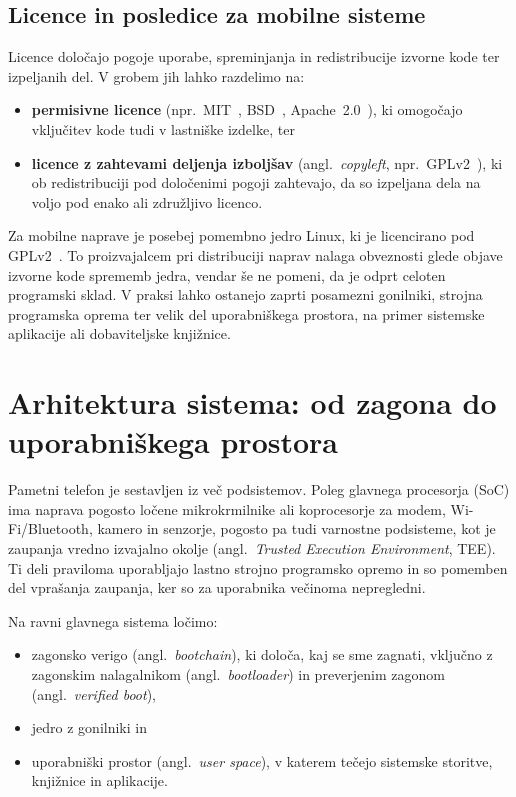 \documentclass[a4paper,12pt,openright]{book}
\begin{document}
\subsection{Licence in posledice za mobilne sisteme}
\label{subsec:teorija_licence}

Licence določajo pogoje uporabe, spreminjanja in redistribucije izvorne kode ter izpeljanih del.
V grobem jih lahko razdelimo na:
\begin{itemize}
  \item \textbf{permisivne licence} (npr.~MIT~\cite{license_mit}, BSD~\cite{license_bsd3}, Apache~2.0~\cite{license_apache2}), ki omogočajo vključitev kode tudi v lastniške izdelke, ter
  \item \textbf{licence z zahtevami deljenja izboljšav} (angl.~\textit{copyleft}, npr.~GPLv2~\cite{license_gpl2}), ki ob redistribuciji pod določenimi pogoji zahtevajo, da so izpeljana dela na voljo pod enako ali združljivo licenco.
\end{itemize}

Za mobilne naprave je posebej pomembno jedro Linux, ki je licencirano pod GPLv2~\cite{license_gpl2}.
To proizvajalcem pri distribuciji naprav nalaga obveznosti glede objave izvorne kode sprememb jedra, vendar še ne pomeni, da je odprt celoten programski sklad.
V praksi lahko ostanejo zaprti posamezni gonilniki, strojna programska oprema ter velik del uporabniškega prostora, na primer sistemske aplikacije ali dobaviteljske knjižnice.

\section{Arhitektura sistema: od zagona do uporabniškega prostora}
\label{sec:teorija_arhitektura}

Pametni telefon je sestavljen iz več podsistemov.
Poleg glavnega procesorja (SoC) ima naprava pogosto ločene mikrokrmilnike ali koprocesorje za modem, Wi-Fi/Bluetooth, kamero in senzorje, pogosto pa tudi varnostne podsisteme, kot je zaupanja vredno izvajalno okolje (angl.~\textit{Trusted Execution Environment}, TEE).
Ti deli praviloma uporabljajo lastno strojno programsko opremo in so pomemben del vprašanja zaupanja, ker so za uporabnika večinoma nepregledni.

Na ravni glavnega sistema ločimo:
\begin{itemize}
  \item zagonsko verigo (angl.~\textit{bootchain}), ki določa, kaj se sme zagnati, vključno z zagonskim nalagalnikom (angl.~\textit{bootloader}) in preverjenim zagonom (angl.~\textit{verified boot}),
  \item jedro z gonilniki in
  \item uporabniški prostor (angl.~\textit{user space}), v katerem tečejo sistemske storitve, knjižnice in aplikacije.
\end{itemize}
\end{document}
